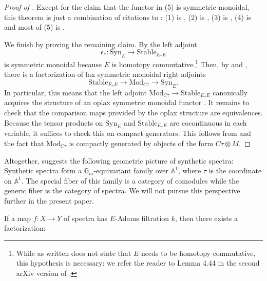 \begin{proof}[Proof of ]
  Except for the claim that the functor in (5) is symmetric monoidal, this theorem is just a combination of citations to \cite{Pstragowski}:
  (1) is \cite[Theorem 4.36 and Proposition 4.39]{Pstragowski}, (2) is \cite[Theorem 4.36]{Pstragowski}, (3) is \cite[Proposition 4.39]{Pstragowski}, (4) is \cite[Corollary 4.45]{Pstragowski} and most of (5) is \cite[Theorem 4.46 and Remark 4.55]{Pstragowski}.

  We finish by proving the remaining claim.
  By \cite[Lemma 4.43]{Pstragowski} the left adjoint
  $$ \epsilon_* : \mathrm{Syn}_E \to \mathrm{Stable}_{E_*E} $$
  is symmetric monoidal because $E$ is homotopy commutative.\footnote{While \cite[Lemma 4.43]{Pstragowski} as written does not state that $E$ needs to be homotopy commutative, this hypothesis is necessary: we refer the reader to Lemma 4.44 in the second arXiv version of \cite{Pstragowski}.} Then, by \cite[Corollary I.2.5.5.3]{SAG} and \cite[Lemma 4.44]{Pstragowski}, there is a factorization of lax symmetric monoidal right adjoints
  $$ \mathrm{Stable}_{E_*E} \to \mathrm{Mod}_{C\tau} \to \mathrm{Syn}_E.$$
  In particular, this means that the left adjoint $\mathrm{Mod}_{C\tau} \to \mathrm{Stable}_{E_* E}$ canonically acquires the structure of an oplax symmetric monoidal functor \cite[Proposition A]{OpLaxAdjoint}.
  It remains to check that the comparison maps provided by the oplax structure are equivalences.
  Because the tensor products on $\mathrm{Syn}_E$ and $\mathrm{Stable}_{E_*E}$ are cocontinuous in each variable, it suffices to check this on compact generators. This follows from \cite[Lemma 4.43]{Pstragowski} and the fact that $\mathrm{Mod}_{C\tau}$ is compactly generated by objects of the form $C\tau \otimes M$. 
\end{proof}

\begin{rmk}
Altogether,  suggests the following geometric picture of synthetic spectra:
Synthetic spectra form a $\mathbb{G}_m$-equivariant family over $\mathbb{A}^1$, where $\tau$ is the coordinate on $\mathbb{A}^1$.
The special fiber of this family is a category of comodules while the generic fiber is the category of spectra.
We will not pursue this perspective further in the present paper.
\end{rmk}

\begin{lem} \label{lemm:adams-fil1}
  If a map $f:X \longrightarrow Y$ of spectra has $E$-Adams filtration $k$, then there exists a factorization:
  \begin{center}
  \end{center}
\end{lem}

